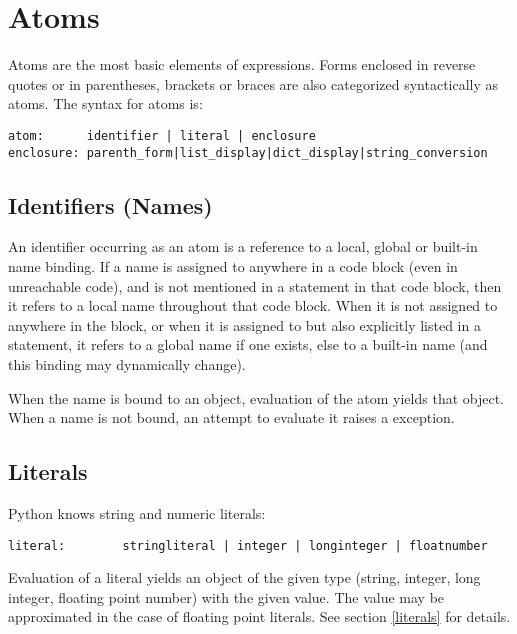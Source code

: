 \section{Atoms}

Atoms are the most basic elements of expressions.  Forms enclosed in
reverse quotes or in parentheses, brackets or braces are also
categorized syntactically as atoms.  The syntax for atoms is:

\begin{verbatim}
atom:      identifier | literal | enclosure
enclosure: parenth_form|list_display|dict_display|string_conversion
\end{verbatim}

\subsection{Identifiers (Names)}

An identifier occurring as an atom is a reference to a local, global
or built-in name binding.  If a name is assigned to anywhere in a code
block (even in unreachable code), and is not mentioned in a
\verb@global@ statement in that code block, then it refers to a local
name throughout that code block.  When it is not assigned to anywhere
in the block, or when it is assigned to but also explicitly listed in
a \verb@global@ statement, it refers to a global name if one exists,
else to a built-in name (and this binding may dynamically change).

When the name is bound to an object, evaluation of the atom yields
that object.  When a name is not bound, an attempt to evaluate it
raises a \verb@NameError@ exception.

\subsection{Literals}

Python knows string and numeric literals:

\begin{verbatim}
literal:        stringliteral | integer | longinteger | floatnumber
\end{verbatim}

Evaluation of a literal yields an object of the given type (string,
integer, long integer, floating point number) with the given value.
The value may be approximated in the case of floating point literals.
See section \ref{literals} for details.


